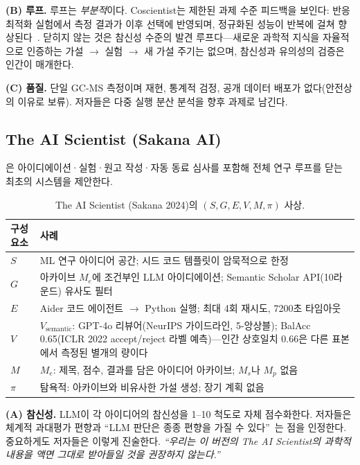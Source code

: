 \documentclass[11pt]{article}
\newcommand{\sgmvpi}{$(S, G, E, V, M, \pi)$}
\begin{document}
\noindent\textbf{(B) 루프.} 루프는 \emph{부분적}이다. Coscientist는 제한된 과제 수준 피드백을 보인다: 반응 최적화 실험에서 측정 결과가 이후 선택에 반영되며, 정규화된 성능이 반복에 걸쳐 향상된다~\citep{boiko2023emergent}. 닫히지 않는 것은 참신성 수준의 발견 루프다---새로운 과학적 지식을 자율적으로 인증하는 가설 $\rightarrow$ 실험 $\rightarrow$ 새 가설 주기는 없으며, 참신성과 유의성의 검증은 인간이 매개한다.

\noindent\textbf{(C) 품질.} 단일 GC-MS 측정이며 재현, 통계적 검정, 공개 데이터 배포가 없다(안전상의 이유로 보류). 저자들은 다중 실행 분산 분석을 향후 과제로 남긴다.

\subsection{The AI Scientist (Sakana AI)}
\label{sec:aisci-sakana}

\citet{lu2024aiscientist}은 아이디에이션·실험·원고 작성·자동 동료 심사를 포함해 전체 연구 루프를 닫는 최초의 시스템을 제안한다.

\begin{table}[h]
\centering
\small
\begin{tabular}{@{}lp{9cm}@{}}
\toprule
구성요소 & 사례 \\
\midrule
$S$ & ML 연구 아이디어 공간; 시드 코드 템플릿이 암묵적으로 한정 \\
$G$ & 아카이브 $M_e$에 조건부인 LLM 아이디에이션; Semantic Scholar API(10라운드) 유사도 필터 \\
$E$ & Aider 코드 에이전트 $\rightarrow$ Python 실행; 최대 4회 재시도, 7200초 타임아웃 \\
$V$ & $V_\text{semantic}$: GPT-4o 리뷰어(NeurIPS 가이드라인, 5-앙상블); BalAcc 0.65(ICLR 2022 accept/reject 라벨 예측)---인간 상호일치 0.66은 다른 표본에서 측정된 별개의 량이다 \\
$M$ & $M_e$: 제목, 점수, 결과를 담은 아이디어 아카이브; $M_s$나 $M_p$ 없음 \\
$\pi$ & 탐욕적: 아카이브와 비유사한 가설 생성; 장기 계획 없음 \\
\bottomrule
\end{tabular}
\caption{The AI Scientist (Sakana 2024)의 \sgmvpi{} 사상.}
\end{table}

\noindent\textbf{(A) 참신성.} LLM이 각 아이디어의 참신성을 1--10 척도로 자체 점수화한다. 저자들은 체계적 과대평가 편향과 ``LLM 판단은 종종 편향을 가질 수 있다''~\citep{lu2024aiscientist}는 점을 인정한다. 중요하게도 저자들은 이렇게 진술한다. \textit{``우리는 이 버전의 The AI Scientist의 과학적 내용을 액면 그대로 받아들일 것을 권장하지 않는다.''}
\end{document}
